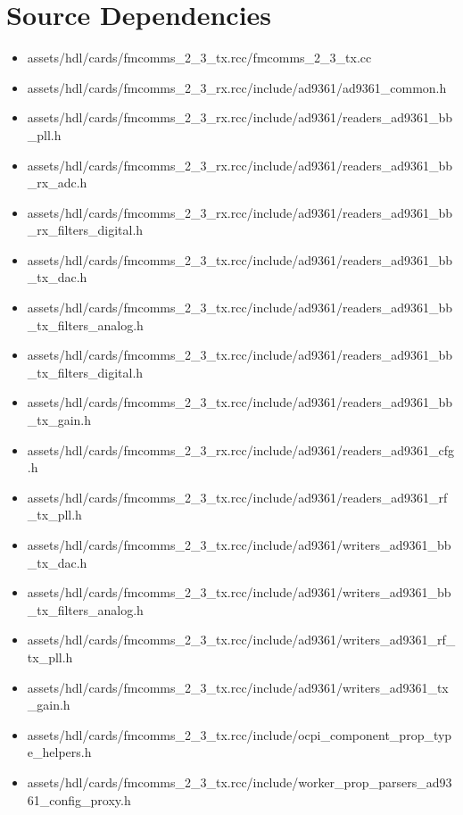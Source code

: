 \documentclass{article}
\begin{document}
\newpage

\section*{Source Dependencies}
\begin{itemize}
	\item assets/hdl/cards/fmcomms\_2\_3\_tx.rcc/fmcomms\_2\_3\_tx.cc
	\item assets/hdl/cards/fmcomms\_2\_3\_rx.rcc/include/ad9361/ad9361\_common.h
	\item assets/hdl/cards/fmcomms\_2\_3\_rx.rcc/include/ad9361/readers\_ad9361\_bb\_pll.h
	\item assets/hdl/cards/fmcomms\_2\_3\_rx.rcc/include/ad9361/readers\_ad9361\_bb\_rx\_adc.h
	\item assets/hdl/cards/fmcomms\_2\_3\_rx.rcc/include/ad9361/readers\_ad9361\_bb\_rx\_filters\_digital.h
	\item assets/hdl/cards/fmcomms\_2\_3\_tx.rcc/include/ad9361/readers\_ad9361\_bb\_tx\_dac.h
	\item assets/hdl/cards/fmcomms\_2\_3\_tx.rcc/include/ad9361/readers\_ad9361\_bb\_tx\_filters\_analog.h
	\item assets/hdl/cards/fmcomms\_2\_3\_tx.rcc/include/ad9361/readers\_ad9361\_bb\_tx\_filters\_digital.h
	\item assets/hdl/cards/fmcomms\_2\_3\_tx.rcc/include/ad9361/readers\_ad9361\_bb\_tx\_gain.h
	\item assets/hdl/cards/fmcomms\_2\_3\_rx.rcc/include/ad9361/readers\_ad9361\_cfg.h
	\item assets/hdl/cards/fmcomms\_2\_3\_tx.rcc/include/ad9361/readers\_ad9361\_rf\_tx\_pll.h
	\item assets/hdl/cards/fmcomms\_2\_3\_tx.rcc/include/ad9361/writers\_ad9361\_bb\_tx\_dac.h
	\item assets/hdl/cards/fmcomms\_2\_3\_tx.rcc/include/ad9361/writers\_ad9361\_bb\_tx\_filters\_analog.h
	\item assets/hdl/cards/fmcomms\_2\_3\_tx.rcc/include/ad9361/writers\_ad9361\_rf\_tx\_pll.h
	\item assets/hdl/cards/fmcomms\_2\_3\_tx.rcc/include/ad9361/writers\_ad9361\_tx\_gain.h
	\item assets/hdl/cards/fmcomms\_2\_3\_tx.rcc/include/ocpi\_component\_prop\_type\_helpers.h
	\item assets/hdl/cards/fmcomms\_2\_3\_tx.rcc/include/worker\_prop\_parsers\_ad9361\_config\_proxy.h
\end{itemize}
\end{document}
